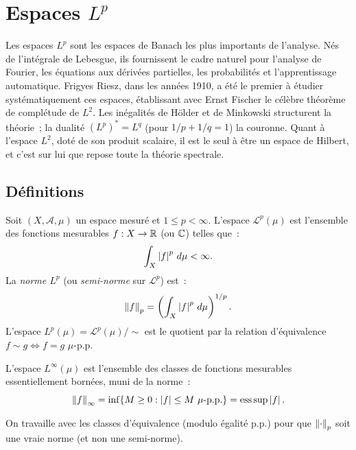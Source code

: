 \chapter{Espaces $L^p$}
\label{ch:espaces_lp}

Les espaces $L^p$ sont les espaces de Banach les plus importants de l'analyse. N\'es de l'int\'egrale de Lebesgue, ils fournissent le cadre naturel pour l'analyse de Fourier, les \'equations aux d\'eriv\'ees partielles, les probabilit\'es et l'apprentissage automatique. Frigyes Riesz, dans les ann\'ees 1910, a \'et\'e le premier \`a \'etudier syst\'ematiquement ces espaces, \'etablissant avec Ernst Fischer le c\'el\`ebre th\'eor\`eme de compl\'etude de $L^2$. Les in\'egalit\'es de H\"older et de Minkowski structurent la th\'eorie~; la dualit\'e $(L^p)^* = L^q$ (pour $1/p + 1/q = 1$) la couronne. Quant \`a l'espace $L^2$, dot\'e de son produit scalaire, il est le seul \`a \^etre un espace de Hilbert, et c'est sur lui que repose toute la th\'eorie spectrale.

\section{D\'efinitions}

\begin{definition}[Espace $L^p$]
Soit $(X, \mathcal{A}, \mu)$ un espace mesur\'e et $1 \leq p < \infty$. L'espace
$\mathcal{L}^p(\mu)$ est l'ensemble des fonctions mesurables $f : X \to \mathbb{R}$
(ou $\mathbb{C}$) telles que~:
\[
\int_X \left| f \right|^p\, d\mu < \infty.
\]
La \emph{norme $L^p$} (ou \emph{semi-norme} sur $\mathcal{L}^p$) est~:
\[
\left\| f \right\|_p = \left(\int_X \left| f \right|^p\, d\mu\right)^{1/p}.
\]
L'espace $L^p(\mu) = \mathcal{L}^p(\mu) / \sim$ est le quotient par la relation
d'\'equivalence $f \sim g \iff f = g$ $\mu$-p.p.
\end{definition}

\begin{definition}
L'espace $L^\infty(\mu)$ est l'ensemble des classes de fonctions mesurables
essentiellement born\'ees, muni de la norme~:
\[
\left\| f \right\|_\infty = \inf\{M \geq 0 : \left| f \right| \leq M \text{ $\mu$-p.p.}\}
= \operatorname{ess\,sup} \left| f \right|.
\]
\end{definition}

\begin{remarque}
On travaille avec les classes d'\'equivalence (modulo \'egalit\'e p.p.) pour que
$\left\| \cdot \right\|_p$ soit une vraie norme (et non une semi-norme).
\end{remarque}

